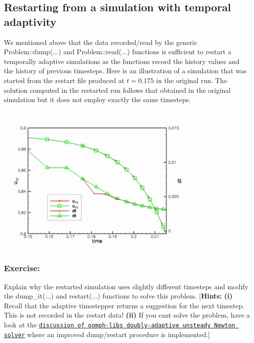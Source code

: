 \hypertarget{index_restarts}{}\subsection{Restarting from a simulation with temporal adaptivity}\label{index_restarts}
We mentioned above that the data recorded/read by the generic {\ttfamily Problem\+::dump}(...) and {\ttfamily Problem\+::read}(...) functions is sufficient to restart a temporally adaptive simulations as the functions record the history values and the history of previous timesteps. Here is an illustration of a simulation that was started from the restart file produced at $ t=0.175$ in the original run. The solution computed in the restarted run follows that obtained in the original simulation but it does not employ exactly the same timesteps.

 
\begin{DoxyImage}
\includegraphics[width=0.75\textwidth]{restart_trace}
\end{DoxyImage}
\hypertarget{index_ex}{}\subsubsection{Exercise\+:}\label{index_ex}
Explain why the restarted simulation uses slightly different timesteps and modify the {\ttfamily dump\+\_\+it}(...) and {\ttfamily restart}(...) functions to solve this problem. \mbox{[}{\bfseries Hints\+:} {\bfseries  (i) } Recall that the adaptive timestepper returns a suggestion for the next timestep. This is not recorded in the restart data! {\bfseries  (ii) } If you can\textquotesingle{}t solve the problem, have a look at the \href{../../two_d_unsteady_heat_2adapt/html/index.html}{\tt discussion of {\ttfamily oomph-\/lib\textquotesingle{}s} doubly-\/adaptive unsteady Newton solver} where an improved dump/restart procedure is implemented.\mbox{]}



